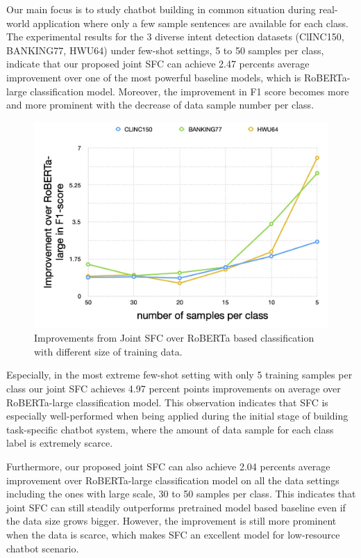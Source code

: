 Our main focus  is  to  study  chatbot  building  in common situation during real-world
application  where  only  a few sample sentences are available for each class.
The  experimental  results  for  the  3  diverse  intent detection datasets
(ClINC150,  BANKING77,  HWU64)  under  few-shot  settings, 5 to 50 samples per
class,  indicate that our proposed joint SFC can achieve 2.47 percents average
improvement   over  one  of  the  most  powerful  baseline  models,  which  is
RoBERTa-large  classification  model.  Moreover,  the  improvement  in F1 score
becomes  more  and  more prominent with the decrease of data sample number per
class.

\begin{figure}[t]
  \begin{centering}
    \includegraphics[scale=0.2]{picture/improvement_trend.jpg} 
    \par
  \end{centering}
  \caption{
    Improvements  from  Joint  SFC  over  RoBERTa  based  classification  with
    different size of training data.
  }
  \label{fig:trend}
\end{figure}

Especially,  in the most extreme few-shot setting with only 5 training samples
per  class  our joint SFC achieves 4.97 percent points improvements on average
over  RoBERTa-large classification model. This observation indicates that SFC
is  especially  well-performed  when being applied during the initial stage of
building  task-specific  chatbot  system,  where the amount of data sample for
each class label is extremely scarce.

Furthermore,  our  proposed  joint  SFC can also achieve 2.04 percents average
improvement  over  RoBERTa-large classification model on all the data settings
including  the  ones  with  large  scale,  30  to  50  samples per class. This
indicates that joint SFC can still steadily outperforms pretrained model based
baseline even if the data size grows bigger. However, the improvement is still
more prominent when the data is scarce, which makes SFC an excellent model for
low-resource chatbot scenario.

